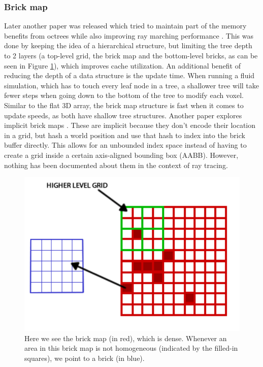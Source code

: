 \subsubsection{Brick map} \label{related_work:voxel_data_structures:brickmap}
Later another paper was released which tried to maintain part of the memory benefits from octrees while also improving ray marching performance \cite{van2015real}. This was done by keeping the idea of a hierarchical structure, but limiting the tree depth to 2 layers (a top-level grid, the brick map and the bottom-level bricks, as can be seen in Figure \ref{fig:brickmap}), which improves cache utilization. An additional benefit of reducing the depth of a data structure is the update time. When running a fluid simulation, which has to touch every leaf node in a tree, a shallower tree will take fewer steps when going down to the bottom of the tree to modify each voxel. Similar to the flat 3D array, the brick map structure is fast when it comes to update speeds, as both have shallow tree structures. Another paper explores implicit brick maps \cite{niessner2013real}. These are implicit because they don't encode their location in a grid, but hash a world position and use that hash to index into the brick buffer directly. This allows for an unbounded index space instead of having to create a grid inside a certain axis-aligned bounding box (AABB). However, nothing has been documented about them in the context of ray tracing.

\begin{figure}
    \centering
    \includegraphics[width=\linewidth]{figures/brickmap.png}
    \caption{Here we see the brick map (in red), which is dense. Whenever an area in this brick map is not homogeneous (indicated by the filled-in squares), we point to a brick (in blue). \cite{van2015real}}
    \label{fig:brickmap}
\end{figure}
